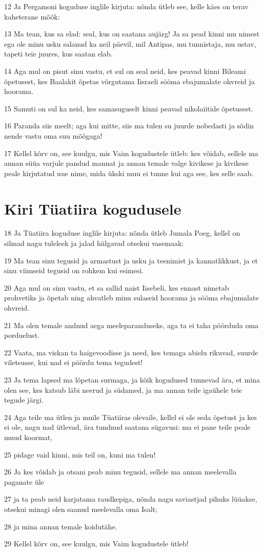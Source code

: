 \par 12 Ja Pergamoni koguduse inglile kirjuta: nõnda ütleb see, kelle käes on terav kaheterane mõõk:
\par 13 Ma tean, kus sa elad: seal, kus on saatana aujärg! Ja sa pead kinni mu nimest ega ole minu usku salanud ka neil päevil, mil Antipas, mu tunnistaja, mu ustav, tapeti teie juures, kus saatan elab.
\par 14 Aga mul on pisut sinu vastu, et sul on seal neid, kes peavad kinni Bileami õpetusest, kes Baalakit õpetas võrgutama Iisraeli sööma ebajumalate ohvreid ja hoorama.
\par 15 Samuti on sul ka neid, kes samasuguselt kinni peavad nikolaiitide õpetusest.
\par 16 Paranda siis meelt; aga kui mitte, siis ma tulen su juurde nobedasti ja sõdin nende vastu oma suu mõõgaga!
\par 17 Kellel kõrv on, see kuulgu, mis Vaim kogudustele ütleb: kes võidab, sellele ma annan süüa varjule pandud mannat ja annan temale valge kivikese ja kivikese peale kirjutatud uue nime, mida ükski muu ei tunne kui aga see, kes selle saab.

\section*{Kiri Tüatiira kogudusele}

\par 18 Ja Tüatiira koguduse inglile kirjuta: nõnda ütleb Jumala Poeg, kellel on silmad nagu tuleleek ja jalad hiilgavad otsekui vasemaak:
\par 19 Ma tean sinu tegusid ja armastust ja usku ja teenimist ja kannatlikkust, ja et sinu viimseid tegusid on rohkem kui esimesi.
\par 20 Aga mul on sinu vastu, et sa sallid naist Iisebeli, kes ennast nimetab prohvetiks ja õpetab ning ahvatleb minu sulaseid hoorama ja sööma ebajumalate ohvreid.
\par 21 Ma olen temale andnud aega meeleparanduseks, aga ta ei taha pöörduda oma porduelust.
\par 22 Vaata, ma viskan ta haigevoodisse ja need, kes temaga abielu rikuvad, suurde viletsusse, kui nad ei pöördu tema tegudest!
\par 23 Ja tema lapsed ma lõpetan surmaga, ja kõik kogudused tunnevad ära, et mina olen see, kes katsub läbi neerud ja südamed, ja ma annan teile igaühele teie tegude järgi.
\par 24 Aga teile ma ütlen ja muile Tüatiiras olevaile, kellel ei ole seda õpetust ja kes ei ole, nagu nad ütlevad, ära tundnud saatana sügavusi: ma ei pane teile peale muud koormat,
\par 25 pidage vaid kinni, mis teil on, kuni ma tulen!
\par 26 Ja kes võidab ja otsani peab minu tegusid, sellele ma annan meelevalla paganate üle
\par 27 ja ta peab neid karjatama raudkepiga, nõnda nagu saviastjad pihuks lüüakse, otsekui minagi olen saanud meelevalla oma Isalt;
\par 28 ja mina annan temale koidutähe.
\par 29 Kellel kõrv on, see kuulgu, mis Vaim kogudustele ütleb!


